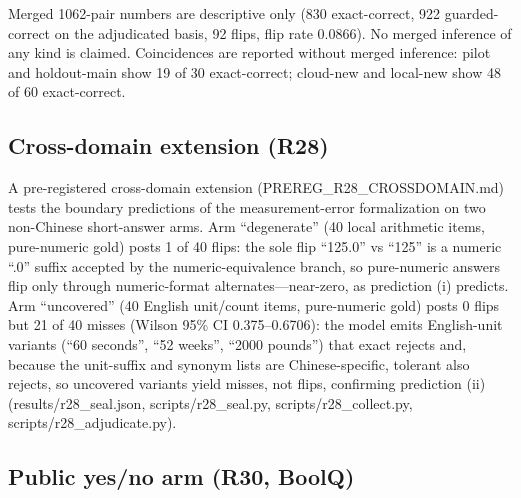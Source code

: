 \documentclass[10pt]{article} %
\begin{document}
Merged 1062-pair numbers are descriptive only (830 exact-correct, 922 guarded-correct on the adjudicated basis, 92 flips, flip rate 0.0866). No merged inference of any kind is claimed. Coincidences are reported without merged inference: pilot and holdout-main show 19 of 30 exact-correct; cloud-new and local-new show 48 of 60 exact-correct.

\subsection{Cross-domain extension (R28)}

A pre-registered cross-domain extension (PREREG\_R28\_CROSSDOMAIN.md) tests the boundary predictions of the measurement-error formalization on two non-Chinese short-answer arms. Arm ``degenerate'' (40 local arithmetic items, pure-numeric gold) posts 1 of 40 flips: the sole flip ``125.0'' vs ``125'' is a numeric ``.0'' suffix accepted by the numeric-equivalence branch, so pure-numeric answers flip only through numeric-format alternates---near-zero, as prediction (i) predicts. Arm ``uncovered'' (40 English unit/count items, pure-numeric gold) posts 0 flips but 21 of 40 misses (Wilson 95\% CI 0.375--0.6706): the model emits English-unit variants (``60 seconds'', ``52 weeks'', ``2000 pounds'') that exact rejects and, because the unit-suffix and synonym lists are Chinese-specific, tolerant also rejects, so uncovered variants yield misses, not flips, confirming prediction (ii) (results/r28\_seal.json, scripts/r28\_seal.py, scripts/r28\_collect.py, scripts/r28\_adjudicate.py).

\subsection{Public yes/no arm (R30, BoolQ)}
\end{document}
